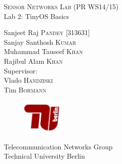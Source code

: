 \documentclass[11pt]{article} %
\begin{document}

\begin{titlepage}
\begin{center}


\newcommand{\HRule}{\rule{\linewidth}{0.5mm}} %


\vspace{30 mm}

\textsc{\large Sensor Networks Lab (PR WS14/15) }\\[1cm] %

{\huge Lab 2: TinyOS Basics} \\[1cm] %

\begin{minipage}{0.5\textwidth}
\begin{flushleft}
\center
Sanjeet Raj \textsc{Pandey} [313631]\\
Sanjay Santhosh \textsc{Kumar}\\
Muhammad Tauseef \textsc{Khan}\\
Rajibul Alam \textsc{Khan}\\[2cm]

Supervisor: \\
Vlado \textsc{Handziski}\\ 
Tim \textsc{Bormann} \\
\vspace{30 mm}
\begin{figure}[H]
 \centering
 \includegraphics[width=2cm]{logo}
\end{figure}
Telecommunication Networks Group\\
Technical University Berlin\\ 
\end{flushleft}

\end{minipage} \\[1cm]
\end{center}

\vspace{30 mm}
\end{titlepage}
\end{document}
